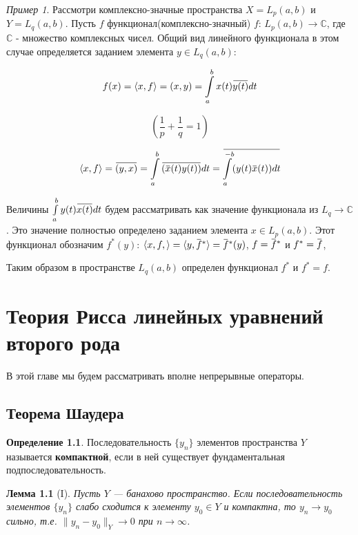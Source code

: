 \documentclass[12pt,a4paper,titlepage,oneside]{book}
\newcommand{\overbar}[1]{\mkern 1.5mu\overline{\mkern-1.5mu#1\mkern-1.5mu}\mkern 1.5mu}
\theoremstyle{definition}
\newtheorem*{definition}{Определение}
\theoremstyle{plain}
\theoremstyle{break}
\theoremstyle{remark}
\theoremstyle{remark}
\newtheorem*{example}{Пример}
\theoremstyle{remark}
\theoremstyle{remark}
\theoremstyle{plain}
\newtheorem*{lemma}{Лемма}
\theoremstyle{plain}
\begin{document}
\begin{example}
Рассмотри комплексно-значные пространства $X=L_p(a,b)$ и $Y=L_q(a,b)$. Пусть $f$ функционал(комплексно-значный) $f$: $L_p(a,b) \to \mathbb{C}$, где $\mathbb{C}$ - множество комплексных чисел. Общий вид линейного функционала в этом случае определяется заданием элемента $y \in L_q(a,b)$:

$$ f(x) = \langle x, f \rangle = (x,y) = \displaystyle\int\limits_a^b x(t)\overbar{y(t)}dt $$

$$ (\frac{1}{p} + \frac{1}{q} = 1) $$

$$ \langle x, f \rangle  = \overbar{(y,x)}  = \displaystyle\int\limits_a^b \overbar{(\overbar{x}(t)y(t))} dt = \overbar{\displaystyle\int\limits_a^{-b} (y(t)\overbar{x}(t))dt} $$

Величины $\int\limits_a^b y(t)\overbar{x(t)} dt$ будем рассматривать как значение функционала из $L_q \to \mathbb{C}$. Это значение полностью определено заданием элемента $x \in L_p(a,b)$. Этот функционал обозначим $f^{*}(y)$:
$\langle x,f, \rangle = \langle y,\overbar{f}^{*} \rangle = \overbar{f}^{*}(y)$, $f=\overbar{f}^{*}$ и $f^{*}=\overbar{f}$,

Таким образом в пространстве $L_q(a,b)$ определен функционал $f^{*}$ и $f^{*}=f$.
\end{example}

\chapter{Теория Рисса линейных уравнений второго рода}

В этой главе мы будем рассматривать вполне непрерывные операторы.

\section{Теорема Шаудера}

\begin{definition}
Последовательность $\{y_n\}$ элементов пространства $Y$ называется \textbf{компактной}, если в ней существует фундаментальная подпоследовательность.
\end{definition}

\begin{lemma}[I]
Пусть $Y$ --- банахово пространство. Если последовательность элементов $\{y_n\}$ слабо сходится к элементу $y_0 \in Y$ и компактна, то $y_n\to y_0$ сильно, т.е. \mbox{$\lVert y_n - y_0\rVert_Y\to 0$} при $n\to\infty$.
\end{lemma}
\end{document}
